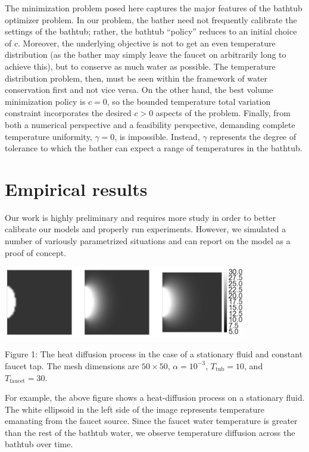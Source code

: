 \documentclass[12pt]{amsart}
\begin{document}
The minimization problem posed here captures the major features of the bathtub
optimizer problem. In our problem, the bather need not frequently calibrate the
settings of the bathtub; rather, the bathtub ``policy'' reduces to an initial
choice of $c$. Moreover, the underlying objective is not to get an even temperature
distribution (as the bather may simply leave the faucet on arbitrarily long to
achieve this), but to conserve as much water as possible. The temperature
distribution problem, then, must be seen within the framework of water
conservation first and not vice versa. On the other hand, the best volume
minimization policy is $c=0$, so the bounded temperature total variation
constraint incorporates the desired $c > 0$ aspects of the problem. Finally,
from both a numerical perspective and a feasibility perspective, demanding
complete temperature uniformity, $\gamma = 0$, is impossible. Instead, $\gamma$
represents the degree of tolerance to which the bather can expect a range of
temperatures in the bathtub.

\section{Empirical results}

Our work is highly preliminary and requires more study in order to better
calibrate our models and properly run experiments. However, we simulated a
number of variously parametrized situations and can report on the model as a
proof of concept.

\begin{center}
\includegraphics[width=0.8\textwidth]{../plots/diffusion-01.png}

Figure 1: The heat diffusion process in the case of a stationary fluid and
constant faucet tap. The mesh
dimensions are $50 \times 50$, $\alpha = 10^{-3}$, $T_{\mathrm{tub}} = 10$, and
$T_{\mathrm{faucet}} = 30$.
\end{center}

For example, the above figure shows a heat-diffusion process on a stationary
fluid. The white ellipsoid in the left side of the image represents temperature
emanating from the faucet source. Since the faucet water temperature is greater
than the rest of the bathtub water, we observe temperature diffusion across the
bathtub over time.
\end{document}
